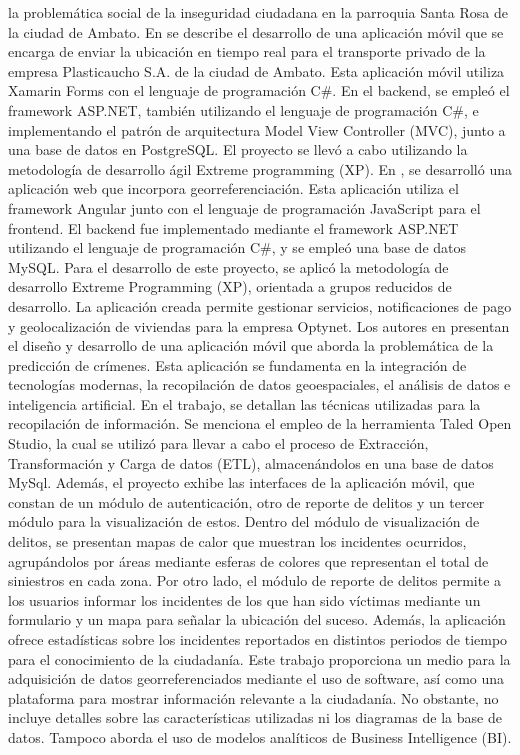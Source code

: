 la problemática social de la inseguridad ciudadana en la parroquia Santa Rosa de la ciudad de Ambato.
\bigbreak
En \cite{lesanoperezAplicativoMovilGeoubicacion2022} se describe el desarrollo de una aplicación móvil que se encarga de enviar
la ubicación en tiempo real para el transporte privado de la empresa Plasticaucho S.A. de la ciudad de Ambato. Esta aplicación móvil
utiliza Xamarin Forms con el lenguaje de programación C\#. En el backend, se empleó el framework ASP.NET, también utilizando el lenguaje
de programación C\#, e implementando el patrón de arquitectura Model View Controller (MVC), junto a una base de datos en PostgreSQL. El proyecto se llevó a
cabo utilizando la metodología de desarrollo ágil Extreme programming (XP).
\bigbreak
En \cite{chicaizavillegasAplicacionWebPara2023}, se desarrolló una aplicación web que incorpora georreferenciación.
Esta aplicación utiliza el framework Angular junto con el lenguaje de programación JavaScript para el frontend. El backend fue
implementado mediante el framework ASP.NET utilizando el lenguaje de programación C\#, y se empleó una base de datos MySQL. Para
el desarrollo de este proyecto, se aplicó la metodología de desarrollo Extreme Programming (XP), orientada a grupos reducidos de
desarrollo. La aplicación creada permite gestionar servicios, notificaciones de pago y geolocalización de viviendas para la empresa
Optynet.
\bigbreak
Los autores en \cite{gomezcantilloAplicativoMovilPara} presentan el diseño y desarrollo de una aplicación móvil que aborda la
problemática de la predicción de crímenes. Esta aplicación se fundamenta en la integración de tecnologías modernas, la recopilación
de datos geoespaciales, el análisis de datos e inteligencia artificial. En el trabajo, se detallan las técnicas utilizadas para la
recopilación de información. Se menciona el empleo de la herramienta Taled Open Studio, la cual se utilizó para llevar a cabo el
proceso de Extracción, Transformación y Carga de datos (ETL), almacenándolos en una base de datos MySql. Además, el proyecto exhibe
las interfaces de la aplicación móvil, que constan de un módulo de autenticación, otro de reporte de delitos y un tercer módulo para
la visualización de estos. Dentro del módulo de visualización de delitos, se presentan mapas de calor que muestran los incidentes
ocurridos, agrupándolos por áreas mediante esferas de colores que representan el total de siniestros en cada zona. Por otro lado,
el módulo de reporte de delitos permite a los usuarios informar los incidentes de los que han sido víctimas mediante un formulario
y un mapa para señalar la ubicación del suceso. Además, la aplicación ofrece estadísticas sobre los incidentes reportados en distintos
periodos de tiempo para el conocimiento de la ciudadanía. Este trabajo proporciona un medio para la adquisición de datos georreferenciados
mediante el uso de software, así como una plataforma para mostrar información relevante a la ciudadanía. No obstante, no incluye detalles
sobre las características utilizadas ni los diagramas de la base de datos. Tampoco aborda el uso de modelos analíticos de Business
Intelligence (BI).
